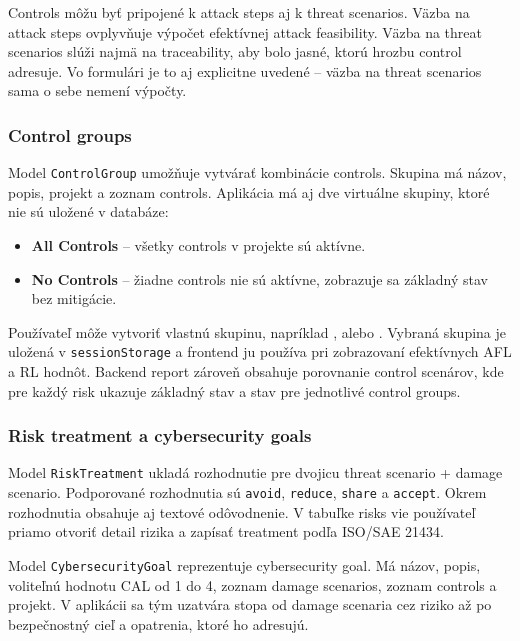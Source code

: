 \documentclass[11pt]{article}
\begin{document}
Controls môžu byť pripojené k attack steps aj k threat scenarios. Väzba na attack steps ovplyvňuje výpočet efektívnej attack feasibility. Väzba na threat scenarios slúži najmä na traceability, aby bolo jasné, ktorú hrozbu control adresuje. Vo formulári je to aj explicitne uvedené -- väzba na threat scenarios sama o sebe nemení výpočty.

\subsubsection{Control groups}

Model \texttt{ControlGroup} umožňuje vytvárať kombinácie controls. Skupina má názov, popis, projekt a zoznam controls. Aplikácia má aj dve virtuálne skupiny, ktoré nie sú uložené v databáze:

\begin{itemize}
    \item \textbf{All Controls} -- všetky controls v projekte sú aktívne.
    \item \textbf{No Controls} -- žiadne controls nie sú aktívne, zobrazuje sa základný stav bez mitigácie.
\end{itemize}

Používateľ môže vytvoriť vlastnú skupinu, napríklad ,  alebo . Vybraná skupina je uložená v \texttt{sessionStorage} a frontend ju používa pri zobrazovaní efektívnych AFL a RL hodnôt. Backend report zároveň obsahuje porovnanie control scenárov, kde pre každý risk ukazuje základný stav a stav pre jednotlivé control groups.

\subsubsection{Risk treatment a cybersecurity goals}

Model \texttt{RiskTreatment} ukladá rozhodnutie pre dvojicu threat scenario + damage scenario. Podporované rozhodnutia sú \texttt{avoid}, \texttt{reduce}, \texttt{share} a \texttt{accept}. Okrem rozhodnutia obsahuje aj textové odôvodnenie. V tabuľke risks vie používateľ priamo otvoriť detail rizika a zapísať treatment podľa ISO/SAE 21434.

Model \texttt{CybersecurityGoal} reprezentuje cybersecurity goal. Má názov, popis, voliteľnú hodnotu CAL od 1 do 4, zoznam damage scenarios, zoznam controls a projekt. V aplikácii sa tým uzatvára stopa od damage scenaria cez riziko až po bezpečnostný cieľ a opatrenia, ktoré ho adresujú.
\end{document}

